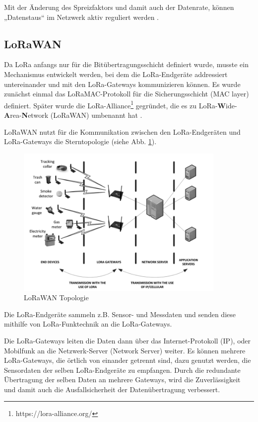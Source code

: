 Mit der Änderung des Spreizfaktors und damit auch der Datenrate, können „Datenstaus“ im Netzwerk aktiv reguliert werden \cite{sf2022}. 

\subsection{LoRaWAN} \label{LoRaWAN}

Da LoRa anfangs nur für die Bitübertragungsschicht definiert wurde, musste ein Mechanismus entwickelt werden, bei dem die LoRa-Endgeräte addressiert untereinander und mit den LoRa-Gateways kommunizieren können. Es wurde zunächst einmal das LoRaMAC-Protokoll für die Sicherungsschicht (MAC layer) definiert. Später wurde die LoRa-Alliance\footnote{https://lora-alliance.org/} gegründet, die es zu LoRa-\textbf{W}ide-\textbf{A}rea-\textbf{N}etwork (LoRaWAN) umbenannt hat \cite{semtech2020}.

LoRaWAN nutzt für die Kommunikation zwischen den LoRa-Endgeräten und LoRa-Gateways die Sterntopologie (siehe Abb. \ref{fig:lorawan-topology}).

\begin{figure}[h]
 \centering
 \includegraphics[width=0.9\textwidth]{pictures/lorawan-topology}
 \caption[LoRaWAN Topologie]{LoRaWAN Topologie \cite{Staniec2020}}
 \label{fig:lorawan-topology}
\end{figure}

Die LoRa-Endgeräte sammeln z.B. Sensor- und Messdaten und senden diese mithilfe von LoRa-Funktechnik an die LoRa-Gateways. 

Die LoRa-Gateways leiten die Daten dann über das Internet-Protokoll (IP), oder Mobilfunk an die Netzwerk-Server (Network Server) weiter. Es können mehrere LoRa-Gateways, die örtlich von einander getrennt sind, dazu genutzt werden, die Sensordaten der selben LoRa-Endgeräte zu empfangen. Durch die redundante Übertragung der selben Daten an mehrere Gateways, wird die Zuverlässigkeit und damit auch die Ausfallsicherheit der Datenübertragung verbessert.

